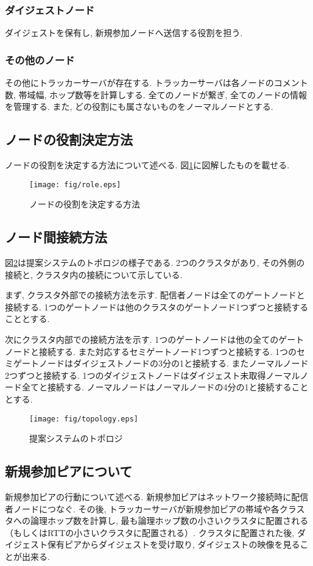 \subsubsection{ダイジェストノード}
ダイジェストを保有し, 新規参加ノードへ送信する役割を担う.

\subsubsection{その他のノード}
その他にトラッカーサーバが存在する. トラッカーサーバは各ノードのコメント数, 帯域幅, ホップ数等を計算しする. 全てのノードが繋ぎ, 全てのノードの情報を管理する. また, どの役割にも属さないものをノーマルノードとする.

\subsection{ノードの役割決定方法}
ノードの役割を決定する方法について述べる. 図\ref{fig:role}に図解したものを載せる.

\begin{figure}[h]
  \centering
  \texttt{[image: fig/role.eps]}
  \caption{ノードの役割を決定する方法}
  \label{fig:role}
\end{figure}


\subsection{ノード間接続方法}
図\ref{fig:topology}は提案システムのトポロジの様子である. 2つのクラスタがあり, その外側の接続と, クラスタ内の接続について示している.

まず, クラスタ外部での接続方法を示す. 配信者ノードは全てのゲートノードと接続する. 1つのゲートノードは他のクラスタのゲートノード1つずつと接続することとする.

次にクラスタ内部での接続方法を示す. 1つのゲートノードは他の全てのゲートノードと接続する. また対応するセミゲートノード1つずつと接続する. 1つのセミゲートノードはダイジェストノードの3分の1と接続する. またノーマルノード2つずつと接続する. 1つのダイジェストノードはダイジェスト未取得ノーマルノード全てと接続する. ノーマルノードはノーマルノードの4分の1と接続することとする.

\begin{figure}[h]
  \centering
  \texttt{[image: fig/topology.eps]}
  \caption{提案システムのトポロジ}
  \label{fig:topology}
\end{figure}

\subsection{新規参加ピアについて}
新規参加ピアの行動について述べる. 新規参加ピアはネットワーク接続時に配信者ノードにつなぐ. その後, トラッカーサーバが新規参加ピアの帯域や各クラスタへの論理ホップ数を計算し, 最も論理ホップ数の小さいクラスタに配置される（もしくはRTTの小さいクラスタに配置される）. クラスタに配置された後, ダイジェスト保有ピアからダイジェストを受け取り, ダイジェストの映像を見ることが出来る.

